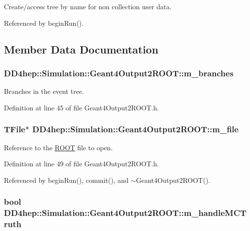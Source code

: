 Create/access tree by name for non collection user data. 

Referenced by beginRun().

\subsection{Member Data Documentation}
\hypertarget{class_d_d4hep_1_1_simulation_1_1_geant4_output2_r_o_o_t_aaa47a8c6bcede196e832490b3a7c90bd}{
\subsubsection[{m\_\-branches}]{ {\bf DD4hep::Simulation::Geant4Output2ROOT::m\_\-branches}}}
\label{class_d_d4hep_1_1_simulation_1_1_geant4_output2_r_o_o_t_aaa47a8c6bcede196e832490b3a7c90bd}


Branches in the event tree. 

Definition at line 45 of file Geant4Output2ROOT.h.\hypertarget{class_d_d4hep_1_1_simulation_1_1_geant4_output2_r_o_o_t_aaaa94e6e9906bc1853e149bc82cfb2af}{
\subsubsection[{m\_\-file}]{\setlength{\rightskip}{0pt plus 5cm}TFile$\ast$ {\bf DD4hep::Simulation::Geant4Output2ROOT::m\_\-file}}}
\label{class_d_d4hep_1_1_simulation_1_1_geant4_output2_r_o_o_t_aaaa94e6e9906bc1853e149bc82cfb2af}


Reference to the \hyperlink{namespace_r_o_o_t}{ROOT} file to open. 

Definition at line 49 of file Geant4Output2ROOT.h.

Referenced by beginRun(), commit(), and $\sim$Geant4Output2ROOT().\hypertarget{class_d_d4hep_1_1_simulation_1_1_geant4_output2_r_o_o_t_a3c70e98cb0a96de60a51443482a88c9f}{
\subsubsection[{m\_\-handleMCTruth}]{\setlength{\rightskip}{0pt plus 5cm}bool {\bf DD4hep::Simulation::Geant4Output2ROOT::m\_\-handleMCTruth}}}
\label{class_d_d4hep_1_1_simulation_1_1_geant4_output2_r_o_o_t_a3c70e98cb0a96de60a51443482a88c9f}


